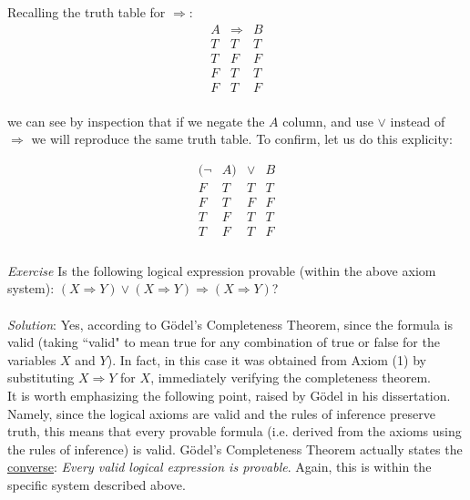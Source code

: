 Recalling the truth table for $\Longrightarrow$:\\

\begin{displaymath}
\begin{array}{|c|c|c|}
A & \Longrightarrow & B \\
\hline
T & T & T  \\
T & F & F  \\
F & T & T  \\
F & T & F  \\
\end{array}
\end{displaymath}

we can see by inspection that if we negate the $A$ column, and use $\lor$ instead of $\Longrightarrow$ we will reproduce the same truth table.  To confirm, let us do this explicity:

\begin{displaymath}
\begin{array}{|c|c|c|c|}
(\neg & A) & \lor & B \\
\hline
F & T & T & T  \\
F & T & F & F  \\
T & F & T & T  \\
T & F & T & F \\
\end{array}
\end{displaymath}
\\
\textit{Exercise} Is the following logical expression provable (within the above axiom system): $(X\Longrightarrow Y)\lor (X \Longrightarrow Y)  \Longrightarrow (X \Longrightarrow Y)$?\\\\
\textit{Solution}: Yes, according to G\"odel's Completeness Theorem, since the formula is valid (taking ``valid" to mean true for any combination of true or false for the variables $X$ and $Y$).  In fact, in this case it was obtained from Axiom (1) by substituting $X \Longrightarrow Y$ for $X$, immediately verifying the completeness theorem.\\

It is worth emphasizing the following point, raised by G\"odel in his dissertation.  Namely, since the logical axioms are valid and the rules of inference preserve truth, this means that every provable formula (i.e. derived from the axioms using the rules of inference) is valid.  G\"odel's Completeness Theorem actually states the \underline{converse}:  \textit{Every valid logical expression is provable}.  Again, this is within the specific system described above.
 

